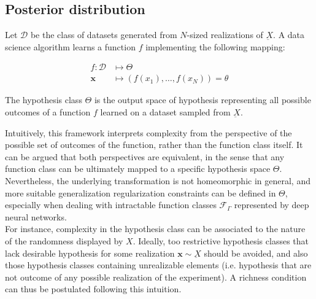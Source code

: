 \subsection{Posterior distribution}


\begin{definition}
    Let $\mathcal{D}$ be the class of datasets generated from $N$-sized realizations of $\underbar{X}$. 
    A data science algorithm learns a function $f$ implementing the following mapping:

    $$
    \begin{aligned}
        f: \mathcal{D} & \longmapsto \Theta \\
        \bm{x}  & \longmapsto (f(x_1), \dots, f(x_N)) = \theta
    \end{aligned}
    $$

    The hypothesis class $\Theta$ is the output space of hypothesis representing all 
    possible outcomes of a function $f$ learned on a dataset sampled from $\underbar{X}$.

\end{definition}

Intuitively, this framework interprets complexity from the perspective of the possible
set of outcomes of the function, rather than the function class itself. It can be argued
that both perspectives are equivalent, in the sense that any function class can be 
ultimately mapped to a specific hypothesis space $\Theta$. Nevertheless, the underlying transformation is not
homeomorphic in general, and more suitable generalization regularization
constraints can be defined in $\Theta$, especially when dealing with intractable
function classes $\mathcal{F}_{\Gamma}$ represented by deep neural networks. \\

For instance, complexity in the hypothesis class can be associated to the nature of the
randomness displayed by $X$. Ideally, too restrictive hypothesis classes that lack desirable
hypothesis for some realization $\bm{x} \sim \underbar{X}$ should be avoided, and also those hypothesis
classes containing unrealizable elements (i.e. hypothesis that are not outcome of
any possible realization of the experiment). A richness condition can thus be postulated following
this intuition. \\

